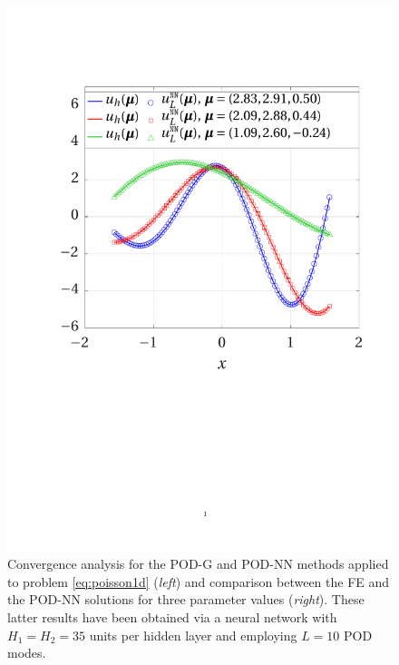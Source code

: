 \documentclass{elsarticle}
\numberwithin{equation}{section}
\theoremstyle{theorem}
\theoremstyle{definition}
\theoremstyle{remark}
\theoremstyle{proposition}
\numberwithin{figure}{section}
\begin{document}
\begin{figure}[t!]
			\includegraphics[scale = 0.385, trim = {1cm 9.5cm 1cm 3.5cm}, clip]{poisson1d_3_fe_vs_podnn_bis}
			
			
			\caption{Convergence analysis for the POD-G and POD-NN methods applied to problem \eqref{eq:poisson1d} (\emph{left}) and comparison between the FE and the POD-NN solutions for three parameter values (\emph{right}). These latter results have been obtained via a neural network with $H_1 = H_2 = 35$ units per hidden layer and employing $L = 10$ POD modes.}
			\label{fig:poisson1d-fig2}
		\end{figure}
				
\end{document}
